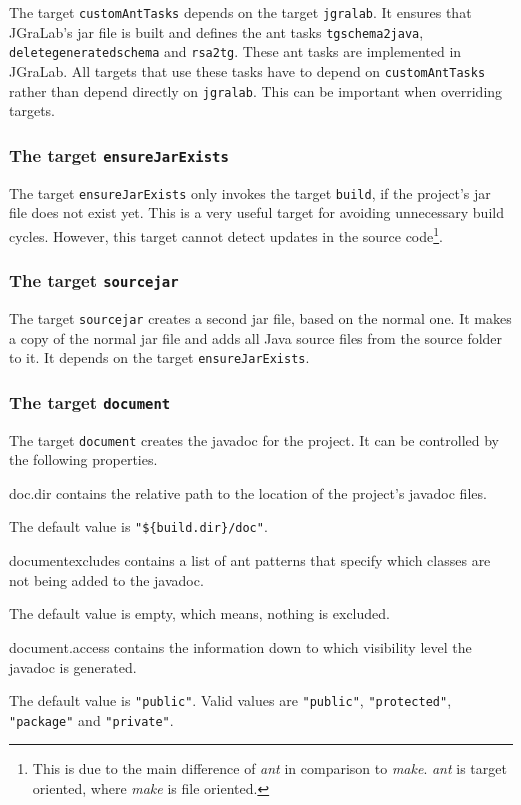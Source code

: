 \documentclass[a4paper,twoside,11pt,bibtotoc]{article}
\begin{document}
The target \texttt{customAntTasks} depends on the target \texttt{jgralab}.
It ensures that JGraLab's jar file is built and defines the ant tasks \texttt{tgschema2java}, \texttt{deletegeneratedschema} and \texttt{rsa2tg}.
These ant tasks are implemented in JGraLab.
All targets that use these tasks have to depend on \texttt{customAntTasks} rather than depend directly on \texttt{jgralab}.
This can be important when overriding targets.

\subsubsection{The target \texttt{ensureJarExists}}
The target \texttt{ensureJarExists} only invokes the target \texttt{build}, if the project's jar file does not exist yet.
This is a very useful target for avoiding unnecessary build cycles.
However, this target cannot detect updates in the source code\footnote{This is due to the main difference of \emph{ant} in comparison to \emph{make}. \emph{ant} is target oriented, where \emph{make} is file oriented.}.

\subsubsection{The target \texttt{sourcejar}}
The target \texttt{sourcejar} creates a second jar file, based on the normal one.
It makes a copy of the normal jar file and adds all Java source files from the source folder to it.
It depends on the target \texttt{ensureJarExists}.

\subsubsection{The target \texttt{document}}
The target \texttt{document} creates the javadoc for the project.
It can be controlled by the following properties.
\begin{description*}
	\item[doc.dir] contains the relative path to the location of the project's javadoc files.\par The default value is \texttt{"\$\{build.dir\}/doc"}.
	\item[documentexcludes] contains a list of ant patterns that specify which classes are not being added to the javadoc.\par The default value is empty, which means, nothing is excluded.
	\item[document.access] contains the information down to which visibility level the javadoc is generated.\par The default value is \texttt{"public"}. Valid values are \texttt{"public"}, \texttt{"protected"}, \texttt{"package"} and \texttt{"private"}.
\end{description*}
\end{document}
